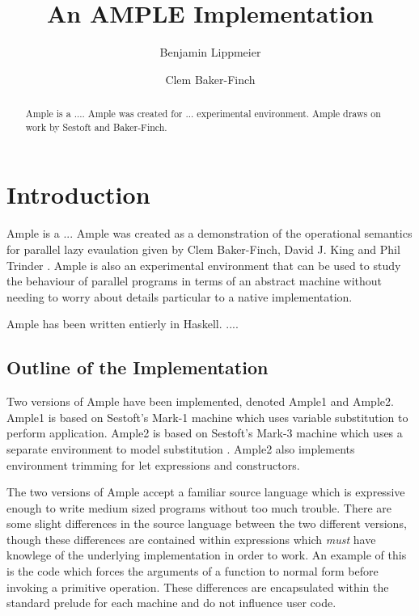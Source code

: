 \documentclass{llncs}
\begin{document}
\title{An AMPLE Implementation}

\author{Benjamin Lippmeier \and Clem Baker-Finch}


\maketitle


\begin{abstract}
Ample is a .... Ample was created for ... experimental environment. Ample draws on work by Sestoft and Baker-Finch.
\end{abstract}

\section{Introduction}
Ample is a ... 
Ample was created as a demonstration of the operational semantics for parallel lazy evaulation given by Clem Baker-Finch, David J. King and Phil Trinder \cite{baker-finch:osple}. Ample is also an experimental environment that can be used to study the behaviour of parallel programs in terms of an abstract machine without needing to worry about details particular to a native implementation.

Ample has been written entierly in Haskell. ....


\subsection{Outline of the Implementation}
Two versions of Ample have been implemented, denoted Ample1 and Ample2. Ample1 is based on Sestoft's Mark-1 machine which uses variable substitution to perform application. Ample2 is based on Sestoft's Mark-3 machine which uses a separate environment to model substitution \cite{sestoft}. Ample2 also implements environment trimming for let expressions and constructors. 

The two versions of Ample accept a familiar source language which is expressive enough to write medium sized programs without too much trouble. There are some slight differences in the source language between the two different versions, though these differences are contained within expressions which \emph{must} have knowlege of the underlying implementation in order to work. An example of this is the code which forces the arguments of a function to normal form before invoking a primitive operation. These differences are encapsulated within the standard prelude for each machine and do not influence user code.
\end{document}

